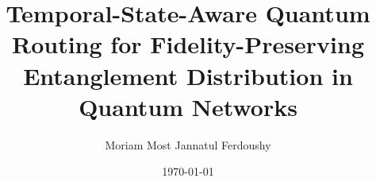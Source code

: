 \documentclass[12pt,a4paper,oneside]{report}
\title{Temporal-State-Aware Quantum Routing for Fidelity-Preserving Entanglement Distribution in Quantum Networks}
\author{Moriam Most Jannatul Ferdoushy}
\date{\today}
\begin{document}
\maketitle

\tableofcontents









\nocite{*}



\end{document}
